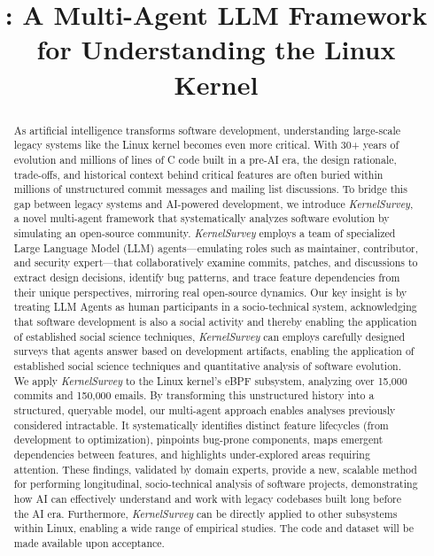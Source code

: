 \documentclass[sigconf,review,anonymous]{acmart}
\title{\sys: A Multi-Agent LLM Framework for Understanding the Linux Kernel}
\newcommand{\sys}{\textit{KernelSurvey}\xspace}
\begin{document}




\begin{abstract}
As artificial intelligence transforms software development, understanding large-scale legacy systems like the Linux kernel becomes even more critical. With 30+ years of evolution and millions of lines of C code built in a pre-AI era, the design rationale, trade-offs, and historical context behind critical features are often buried within millions of unstructured commit messages and mailing list discussions. To bridge this gap between legacy systems and AI-powered development, we introduce \sys, a novel multi-agent framework that systematically analyzes software evolution by simulating an open-source community. \sys employs a team of specialized Large Language Model (LLM) agents—emulating roles such as maintainer, contributor, and security expert—that collaboratively examine commits, patches, and discussions to extract design decisions, identify bug patterns, and trace feature dependencies from their unique perspectives, mirroring real open-source dynamics. Our key insight is by treating LLM Agents as human participants in a socio-technical system,  acknowledging that software development is also a social activity and thereby enabling the application of established social science techniques, \sys can employs carefully designed surveys that agents answer based on development artifacts, enabling the application of established social science techniques and quantitative analysis of software evolution. We apply \sys to the Linux kernel's eBPF subsystem, analyzing over 15,000 commits and 150,000 emails. By transforming this unstructured history into a structured, queryable model, our multi-agent approach enables analyses previously considered intractable. It systematically identifies distinct feature lifecycles (from development to optimization), pinpoints bug-prone components, maps emergent dependencies between features, and highlights under-explored areas requiring attention. These findings, validated by domain experts, provide a new, scalable method for performing longitudinal, socio-technical analysis of software projects, demonstrating how AI can effectively understand and work with legacy codebases built long before the AI era. Furthermore, \sys can be directly applied to other subsystems within Linux, enabling a wide range of empirical studies. The code and dataset will be made available upon acceptance.
\end{abstract}
\end{document}
